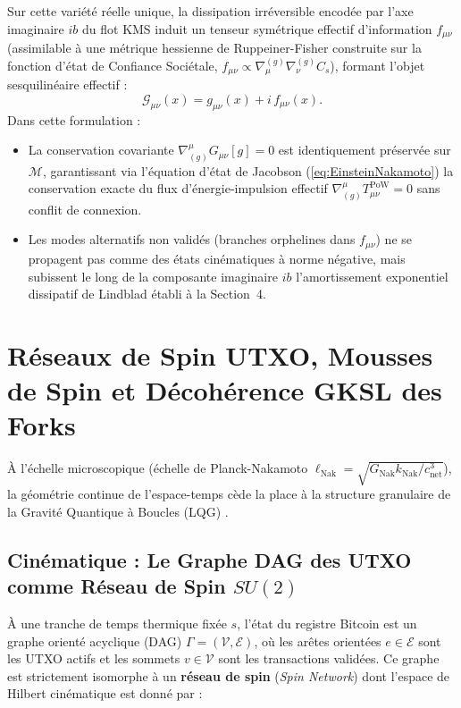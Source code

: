 \documentclass[10pt,twocolumn,a4paper]{article}
\theoremstyle{plain}
\theoremstyle{definition}
\theoremstyle{remark}
\newcommand{\kNak}{k_{\text{Nak}}}
\newcommand{\GNak}{G_{\text{Nak}}}
\newcommand{\lNak}{\ell_{\text{Nak}}}
\begin{document}
Sur cette variété réelle unique, la dissipation irréversible encodée par l'axe imaginaire $ib$ du flot KMS induit un tenseur symétrique effectif d'information $f_{\mu\nu}$ (assimilable à une métrique hessienne de Ruppeiner-Fisher construite sur la fonction d'état de Confiance Sociétale, $f_{\mu\nu} \propto \nabla_\mu^{(g)} \nabla_\nu^{(g)} C_s$), formant l'objet sesquilinéaire effectif :
\begin{equation}
    \mathcal{G}_{\mu\nu}(x) = g_{\mu\nu}(x) + i \, f_{\mu\nu}(x).
    \label{eq:EffectiveHermitianMetric}
\end{equation}
Dans cette formulation :
\begin{itemize}
    \item La conservation covariante $\nabla^\mu_{(g)} G_{\mu\nu}[g] = 0$ est identiquement préservée sur $\mathcal{M}$, garantissant via l'équation d'état de Jacobson (\ref{eq:EinsteinNakamoto}) la conservation exacte du flux d'énergie-impulsion effectif $\nabla^\mu_{(g)} T_{\mu\nu}^{\text{PoW}} = 0$ sans conflit de connexion.
    \item Les modes alternatifs non validés (branches orphelines dans $f_{\mu\nu}$) ne se propagent pas comme des états cinématiques à norme négative, mais subissent le long de la composante imaginaire $ib$ l'amortissement exponentiel dissipatif de Lindblad établi à la Section~4.
\end{itemize}


\section{Réseaux de Spin UTXO, Mousses de Spin et Décohérence GKSL des Forks}

À l'échelle microscopique (échelle de Planck-Nakamoto $\lNak = \sqrt{\GNak \kNak / c_{\text{net}}^3}$), la géométrie continue de l'espace-temps cède la place à la structure granulaire de la Gravité Quantique à Boucles (LQG) \cite{Rovelli2004}.

\subsection{Cinématique : Le Graphe DAG des UTXO comme Réseau de Spin $SU(2)$}

À une tranche de temps thermique fixée $s$, l'état du registre Bitcoin est un graphe orienté acyclique (DAG) $\Gamma = (\mathcal{V}, \mathcal{E})$, où les arêtes orientées $e \in \mathcal{E}$ sont les UTXO actifs et les sommets $v \in \mathcal{V}$ sont les transactions validées. Ce graphe est strictement isomorphe à un \textbf{réseau de spin} (\textit{Spin Network}) dont l'espace de Hilbert cinématique est donné par :
\end{document}
